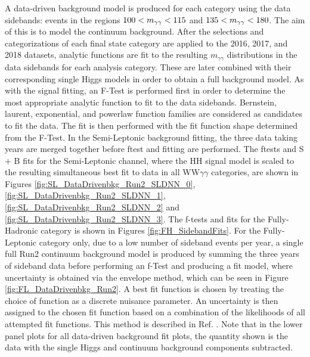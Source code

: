 A data-driven background model is produced for each category using the data sidebands: events in the regions $100 < m_{\gamma\gamma} < 115$ and $135 < m_{\gamma\gamma} < 180$. The aim of this
is to model the continuum background. After the selections and categorizations of each final state category are applied to the 2016, 2017, and 2018 datasets, analytic functions are fit
to the resulting $m_{\gamma\gamma}$ distributions in the data sidebands for each analysis category. These are later combined with their corresponding single Higgs models in order to obtain a full background model. As
with the signal fitting, an F-Test is performed first in order to determine the most appropriate analytic function to fit to the data sidebands. Bernstein, laurent, exponential, and powerlaw function families are considered as
candidates to fit the data. The fit is then performed with the fit function shape determined from the F-Test.
In the Semi-Leptonic background fitting, the three data taking years are merged together before ftest and fitting are performed.
The ftests and S $+$ B fits for the Semi-Leptonic channel, where the HH signal model is scaled to the resulting simultaneous best fit to data in all WW$\gamma\gamma$ categories, are shown in Figures \ref{fig:SL_DataDrivenbkg_Run2_SLDNN_0}, \ref{fig:SL_DataDrivenbkg_Run2_SLDNN_1},
\ref{fig:SL_DataDrivenbkg_Run2_SLDNN_2} and \ref{fig:SL_DataDrivenbkg_Run2_SLDNN_3}. The f-tests and fits for the Fully-Hadronic
category is shown in Figures \ref{fig:FH_SidebandFits}. For the Fully-Leptonic category only, due to a low number of sideband events per year,
a single full Run2 continuum background model is produced by summing the three years of sideband data before performing an f-Test and producing a fit model, where uncertainty is obtained via the envelope method, which can be seen in Figure \ref{fig:FL_DataDrivenbkg_Run2}.
A best fit function is chosen by treating the choice of function as a discrete nuisance parameter.
An uncertainty is then assigned to the chosen fit function based on a combination of the likelihoods of all attempted fit functions. This method is described in
Ref. \cite{Dauncey_2015}. Note that in the lower panel plots for all data-driven background fit plots, the quantity shown is the data with the single Higgs and continuum background components subtracted. 
